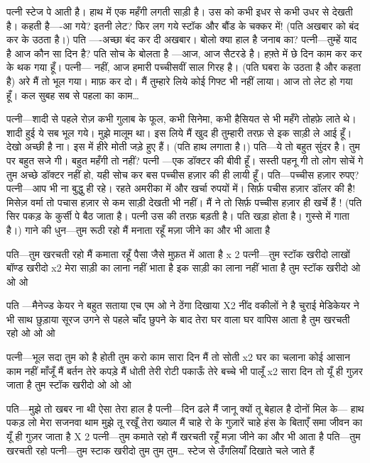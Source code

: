 पत्नी स्टेज पे आती है। हाथ में एक महँगी
लगती साड़ी है। उस को कभी इधर से कभी
उधर से देखती है।
कहती है—-आ गये?
इतनी लेट?
फिर लग गये स्टॉक और बौंड के चक्कर
में!
(पति अखबार को बंद कर के उठता है।)
पति —-अच्छा बंद कर दी अखबार। बोलो
क्या हाल है जनाब का?
पत्नी—तुम्हें याद है आज कौन सा दिन है?
पति सोच के बोलता है —आज, आज सैटरडे
है। हफ़्ते में छे दिन काम कर कर के थक गया हूँ।
पत्नी— नहीं, आज हमारी पच्चीसवीं साल
गिरह है।
(पति घबरा के उठता है और कहता है)
अरे मैं तो भूल गया। माफ़ कर दो। मैं तुम्हारे
लिये कोई गिफ्ट भी नहीं लाया। आज तो
लेट हो गया हूँ। कल सुबह सब से पहला का
काम…

पत्नी—शादी से पहले रोज़ कभी गुलाब के 
फूल, कभी सिनेमा, कभी हैसियत से भी महँगे
तोहफ़े लाते थे। शादी हुई ये सब भूल गये।
मुझे मालूम था।
इस लिये मैं खुद ही तुम्हारी तरफ़ से इक
साड़ी ले आई हूँ।
देखो अच्छी है ना। इस में हीरे मोती जड़े हुए
हैं।
(पति हाथ लगाता है।)
पति—ये तो बहुत सुंदर है। तुम पर बहुत सजे गी। बहुत महँगी तो नहीं?
पत्नी —एक डॉक्टर की बीवी हूँ। सस्ती पहनू 
गी तो लोग सोचें गे तुम अच्छे डॉक्टर नहीं हो,
यही सोच कर बस पच्चीस हज़ार की ही लायी हूँ।
पति—पच्चीस हज़ार रुपए?
पत्नी—आप भी ना बुद्धु ही रहे। रहते 
अमरीका में और खर्चा रुपयों में। सिर्फ़ 
पचीस हज़ार डॉलर की है! मिसेज़ वर्मा तो 
पचास हज़ार से कम साड़ी देखती भी नहीं। मैं 
ने तो सिर्फ़ पच्चीस हज़ार ही खर्चे हैं !
(पति सिर पकड़ के कुर्सी पे बैठ जाता है।
पत्नी उस की तरफ़ बड़ती है। पति खड़ा होता
है। गुस्से में गाता है।) 
गाने की धुन—तुम रूठी रहो मैं मनाता रहूँ
मज़ा जीने का और भी आता है

पति—तुम खरचती रहो मैं कमाता रहूँ
पैसा जैसे मुफ़त में आता है x 2
पत्नी—तुम स्टॉक खरीदो लाखों बॉण्ड खरीदो x2 
मेरा साड़ी का लाना नहीं भाता है
इक साड़ी का लाना नहीं भाता है
तुम स्टॉक खरीदो ओ ओ ओ

पति —मैनेज्ड केयर ने बहुत सताया
एच एम ओ ने ठेंगा दिखाया X2
नींद वकीलों ने है चुराई
मेडिकेयर ने भी साथ छुड़ाया
सूरज उगने से पहले चाँद छुपने के बाद
तेरा घर वाला घर वापिस आता है
तुम खरचती रहो ओ ओ ओ

पत्नी—भूल सदा तुम को है होती
तुम करो काम सारा दिन मैं तो सोती x2
घर का चलाना कोई आसान काम नहीं
माँजूँ मैं बर्तन तेरे कपड़े मैं धोती
तेरी रोटी पकाऊँ तेरे बच्चे भी पालूँ x2
सारा दिन तो यूँ ही गुज़र जाता है
तुम स्टॉक खरीदो ओ ओ ओ

पति—मुझे तो खबर ना थी ऐसा तेरा हाल है
पत्नी—दिन ढले मैं जानू क्यों तू बेहाल है
दोनों मिल के—
हाथ पकड़ लो मेरा सजनवा
थाम मुझे तू रखूँ तेरा ख्याल मैं
चाहे रो के गुज़ारें चाहे हंस के बिताएँ
समा जीवन का यूँ ही गुज़र जाता है X 2
पत्नी—तुम कमाते रहो मैं खरचती रहूँ
मज़ा जीने का और भी आता है
पति—तुम खरचती रहो
पत्नी—तुम स्टाक खरीदो
तुम तुम तुम…
स्टेज से उँगलियाँ दिखाते चले जाते हैं




